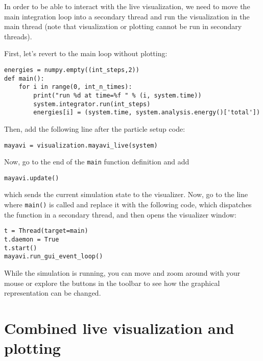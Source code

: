 \documentclass[
paper=a4,                       %
fontsize=11pt,                  %
twoside,                        %
footsepline,                    %
headsepline,                    %
headinclude=false,              %
footinclude=false,              %
pagesize,                       %
]{scrartcl}
\begin{document}
In order to be able to interact with the live visualization, we need to move the main integration loop into a secondary thread and run the visualization in the main thread (note that visualization or plotting cannot be run in secondary threads).

First, let's revert to the main loop without plotting:
\begin{lstlisting}
energies = numpy.empty((int_steps,2))
def main():
    for i in range(0, int_n_times):
        print("run %d at time=%f " % (i, system.time))
        system.integrator.run(int_steps)
        energies[i] = (system.time, system.analysis.energy()['total'])
\end{lstlisting}

Then, add the following line after the particle setup code:
\begin{lstlisting}
mayavi = visualization.mayavi_live(system)
\end{lstlisting}
Now, go to the end of the \lstinline{main} function definition and add
\begin{lstlisting}
mayavi.update()
\end{lstlisting}
which sends the current simulation state to the visualizer.
Now, go to the line where \lstinline{main()} is called and replace it with the following code, which dispatches the function in a secondary thread, and then opens the visualizer window:
\begin{lstlisting}
t = Thread(target=main)
t.daemon = True
t.start()
mayavi.run_gui_event_loop()
\end{lstlisting}
While the simulation is running, you can move and zoom around with your mouse or explore the buttons in the toolbar to see how the graphical representation can be changed.

\section{Combined live visualization and plotting}
\end{document}
